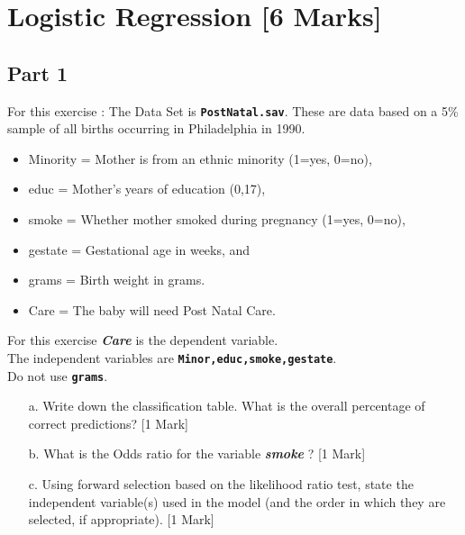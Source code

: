 \documentclass[12pt, a4paper]{article}
\theoremstyle{plain}
\theoremstyle{definition}
\theoremstyle{remark}
\begin{document}
\newpage
\section{Logistic Regression [6 Marks]}   %
\subsection{Part 1}

For this exercise : The Data Set is \textbf{\texttt{PostNatal.sav}}.
These are data based on a 5\% sample of all births occurring in Philadelphia in 1990.

\begin{itemize}
\item Minority = Mother is from an ethnic minority (1=yes, 0=no),
\item educ = Mother's years of education (0,17),
\item smoke = Whether mother smoked during pregnancy (1=yes, 0=no),
\item gestate = Gestational age in weeks, and
\item grams = Birth weight in grams.
\item Care = The baby will need Post Natal Care.
\end{itemize}

\noindent For this exercise \textbf{\textit{Care}} is the dependent variable. \\ The independent variables are \textbf{\texttt{Minor,educ,smoke,gestate}}. \\ Do not use \texttt{\textbf{grams}}.

\newpage
\begin{itemize}
\item[a.] Write down the classification table. What is the overall percentage of correct predictions? [1 Mark]
\item[b.] What is the Odds ratio for the variable \textbf{\textit{smoke}} ? [1 Mark]
\item[c.] Using forward selection based on the likelihood ratio test, state the independent variable(s) used in the model (and the order in which they are selected, if appropriate). [1 Mark]
\end{itemize}
\newpage
\end{document}
